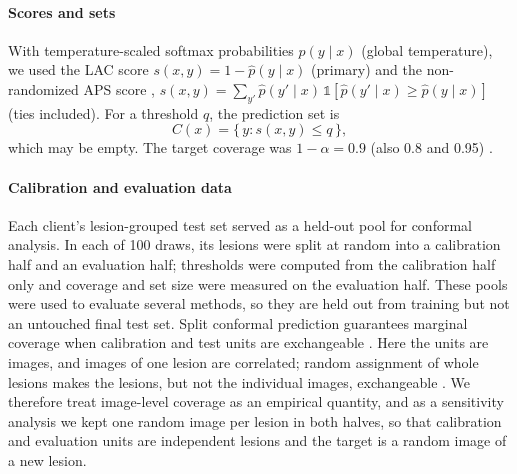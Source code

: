 \documentclass[VANCOUVER,Times1COL]{WileyNJDv5}
\begin{document}
\paragraph{Scores and sets} With temperature-scaled softmax probabilities $\hat p(y\mid x)$ (global
temperature), we used the LAC score $s(x,y)=1-\hat p(y\mid x)$ \cite{sadinle2019lac} (primary) and the
non-randomized APS score \cite{romano2020aps}, $s(x,y)=\sum_{y'}\hat p(y'\mid x)\,\mathbb{1}[\hat
p(y'\mid x)\ge \hat p(y\mid x)]$ (ties included). For a threshold $q$, the prediction set is
\begin{equation}
  C(x)=\{\,y: s(x,y)\le q\,\},
  \label{eq:set}
\end{equation}
which may be empty. The target coverage was $1-\alpha=0.9$ (also 0.8 and 0.95)
\cite{angelopoulos2023gentle}.

\paragraph{Calibration and evaluation data} Each client's lesion-grouped test set served as a held-out
pool for conformal analysis. In each of 100 draws, its lesions were split at random into a calibration
half and an evaluation half; thresholds were computed from the calibration half only and coverage and set
size were measured on the evaluation half. These pools were used to evaluate several methods, so they are
held out from training but not an untouched final test set. Split conformal prediction guarantees
marginal coverage when calibration and test units are exchangeable
\cite{vovk2005algorithmic,angelopoulos2023gentle}. Here the units are images, and images of one lesion are
correlated; random assignment of whole lesions makes the lesions, but not the individual images,
exchangeable \cite{lee2023hierarchical,dunn2022hierarchical}. We therefore treat image-level coverage as an
empirical quantity, and as a sensitivity analysis we kept one random image per lesion in both halves, so
that calibration and evaluation units are independent lesions and the target is a random image of a new
lesion.
\end{document}
